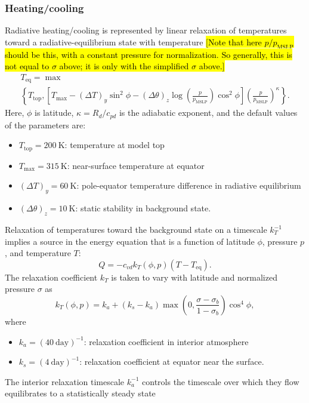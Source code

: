 \documentclass{report}
\begin{document}
\subsubsection{Heating/cooling}

Radiative heating/cooling is represented by linear relaxation of temperatures toward a radiative-equilibrium state with temperature \hl{[Note that here $p/p_{\mathrm{MSLP}}$ should be this, with a constant pressure for normalization. So generally, this is not equal to $\sigma$ above; it is only with the simplified $\sigma$ above.]}
\begin{multline}
    T_{\mathrm{eq}} = \max \\
    \left\{ T_{\mathrm{top}}, \left[ T_{\max} - (\Delta T)_y \sin^2 \phi - (\Delta \theta)_z \log\left(\frac{p}{p_{\mathrm{MSLP}}}\right) \cos^2 \phi \right]
    \left( \frac{p}{p_{\mathrm{MSLP}}} \right)^{\kappa} \right\}.
\end{multline}
Here, $\phi$ is latitude, $\kappa = R_d/c_{pd}$ is the adiabatic exponent, and the default values of the parameters are:
\begin{itemize}
    \item $T_{\mathrm{top}} = 200~\mathrm{K}$: temperature at model top
    \item $T_{\max} = 315~\mathrm{K}$: near-surface temperature at equator
    \item $(\Delta T)_y = 60~\mathrm{K}$: pole-equator temperature difference in radiative equilibrium
    \item $(\Delta \theta)_z = 10~\mathrm{K}$: static stability in background state.
\end{itemize}

Relaxation of temperatures toward the background state on a timescale $k_T^{-1}$ implies a source in the energy equation that is a function of latitude $\phi$, pressure $p$, and temperature $T$:
\begin{equation}
    Q =  - c_{vd} k_T(\phi, p) (T - T_{\mathrm{eq}}).
\end{equation} 
The relaxation coefficient $k_T$ is taken to vary with latitude and normalized pressure $\sigma$ as
\begin{equation}
k_T(\phi, p) = k_a + (k_s - k_a) \max\left(0, \frac{\sigma - \sigma_b}{1-\sigma_b}\right) \cos^4 \phi ,
\end{equation}
where 
\begin{itemize}
    \item $k_a = (40~\mathrm{day})^{-1}$: relaxation coefficient in interior atmosphere
    \item $k_s = (4~\mathrm{day})^{-1}$: relaxation coefficient  at equator near the surface.
\end{itemize}
The interior relaxation timescale $k_a^{-1}$ controls the timescale over which they flow equilibrates to a statistically steady state
\end{document}
